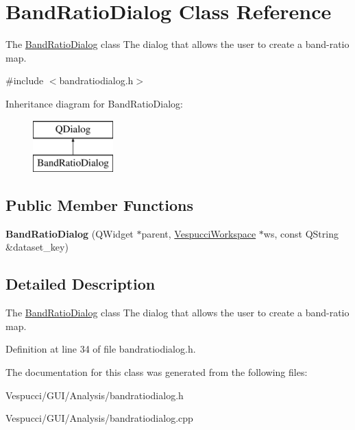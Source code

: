 \hypertarget{class_band_ratio_dialog}{}\section{Band\+Ratio\+Dialog Class Reference}
\label{class_band_ratio_dialog}


The \hyperlink{class_band_ratio_dialog}{Band\+Ratio\+Dialog} class The dialog that allows the user to create a band-\/ratio map.  




{\ttfamily \#include $<$bandratiodialog.\+h$>$}

Inheritance diagram for Band\+Ratio\+Dialog\+:\begin{figure}[H]
\begin{center}
\leavevmode
\includegraphics[height=2.000000cm]{class_band_ratio_dialog}
\end{center}
\end{figure}
\subsection*{Public Member Functions}
\begin{DoxyCompactItemize}
\item 
{\bfseries Band\+Ratio\+Dialog} (Q\+Widget $\ast$parent, \hyperlink{class_vespucci_workspace}{Vespucci\+Workspace} $\ast$ws, const Q\+String \&dataset\+\_\+key)\hypertarget{class_band_ratio_dialog_a4b2ded17fb0fc735487ee8927e4f6978}{}\label{class_band_ratio_dialog_a4b2ded17fb0fc735487ee8927e4f6978}

\end{DoxyCompactItemize}


\subsection{Detailed Description}
The \hyperlink{class_band_ratio_dialog}{Band\+Ratio\+Dialog} class The dialog that allows the user to create a band-\/ratio map. 

Definition at line 34 of file bandratiodialog.\+h.



The documentation for this class was generated from the following files\+:\begin{DoxyCompactItemize}
\item 
Vespucci/\+G\+U\+I/\+Analysis/bandratiodialog.\+h\item 
Vespucci/\+G\+U\+I/\+Analysis/bandratiodialog.\+cpp\end{DoxyCompactItemize}
